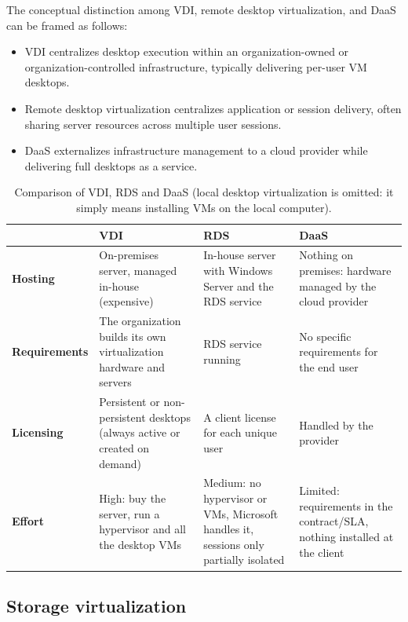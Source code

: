 The conceptual distinction among VDI, remote desktop virtualization, and DaaS can be framed as follows:

\begin{itemize}
\item VDI centralizes desktop execution within an organization-owned or organization-controlled infrastructure, typically delivering per-user VM desktops.
\item Remote desktop virtualization centralizes application or session delivery, often sharing server resources across multiple user sessions.
\item DaaS externalizes infrastructure management to a cloud provider while delivering full desktops as a service.
\end{itemize}

\begin{table}[h]
\centering
\small
\begin{tabular}{@{}p{}p{}p{}p{}@{}}
\toprule
 & \textbf{VDI} & \textbf{RDS} & \textbf{DaaS} \\
\midrule
\textbf{Hosting} & On-premises server, managed in-house (expensive) & In-house server with Windows Server and the RDS service & Nothing on premises: hardware managed by the cloud provider \\
\textbf{Requirements} & The organization builds its own virtualization hardware and servers & RDS service running & No specific requirements for the end user \\
\textbf{Licensing} & Persistent or non-persistent desktops (always active or created on demand) & A client license for each unique user & Handled by the provider \\
\textbf{Effort} & High: buy the server, run a hypervisor and all the desktop VMs & Medium: no hypervisor or VMs, Microsoft handles it, sessions only partially isolated & Limited: requirements in the contract/SLA, nothing installed at the client \\
\bottomrule
\end{tabular}
\caption{Comparison of VDI, RDS and DaaS (local desktop virtualization is omitted: it simply means installing VMs on the local computer).}
\end{table}

\begin{center}
\end{center}

\subsection{Storage virtualization}

